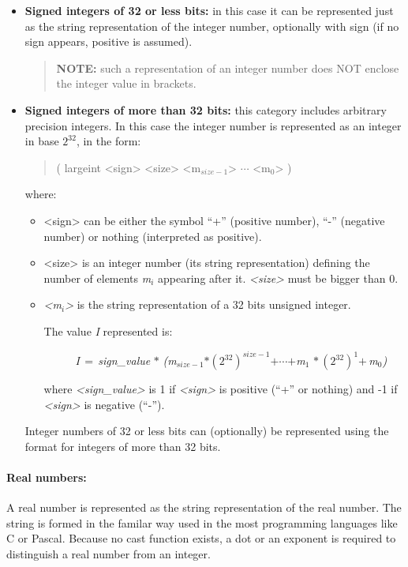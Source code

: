 \documentclass[english,a4paper]{article}
\begin{document}
\begin{itemize}
\item \textbf{Signed integers of 32 or less bits:} in this case it can be
represented just as the string representation of the integer number,
optionally with sign (if no sign appears, positive is assumed).

\begin{quote}
\textbf{NOTE:} such a representation of an integer number does NOT
enclose the integer value in brackets.
\end{quote}
\item \textbf{Signed integers of more than 32 bits:} this category includes
arbitrary precision integers. In this case the integer number is represented
as an integer in base $2^{32}$, in the form:

\begin{quotation}
( largeint <sign> <size> <m$_{size-1}$> $\cdots $ <m$_{0}$> )
\end{quotation}
where:

\begin{itemize}
\item <sign> can be either the symbol {}``+'' (positive number), {}``-''
(negative number) or nothing (interpreted as positive).
\item <size> is an integer number (its string representation) defining the
number of elements \emph{m$_{i}$} appearing after it. \emph{<size>}
must be bigger than 0.
\item \emph{<m$_{i}$>} is the string representation of a 32 bits unsigned
integer.


The value \emph{I} represented is:

\begin{description}
\item[] \emph{I$\, =\, $sign\_value$\, *\, $(m$_{size-1}$$*$$\left(2^{32}\right)^{size-1}$$+$$\cdots $$+$}\emph{m$_{1}$$\, *$$\left(2^{32}\right)^{1}$$+\, $m$_{0}$)}
\end{description}
where \emph{<sign\_value>} is 1 if \emph{<sign>} is positive ({}``+''
or nothing) and -1 if \emph{<sign>} is negative ({}``-'').

\end{itemize}
Integer numbers of 32 or less bits can (optionally) be represented
using the format for integers of more than 32 bits.

\end{itemize}


\paragraph{Real numbers:}
\label{real_numbers}
A real number is represented as the string representation of the real number.
The string is formed in the familar way used in the most programming languages
like C or Pascal. Because no cast function exists, a dot or an exponent is required
to distinguish a real number from an integer.
\end{document}

